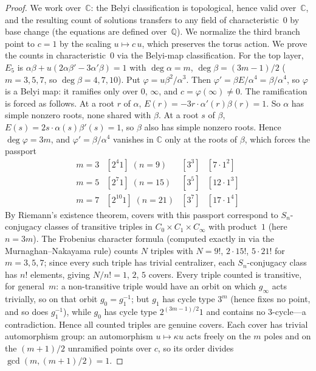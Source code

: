 \documentclass[a4paper,11pt]{article}
\newcommand{\filename}[1]{\texttt{\seqsplit{#1}}}
\theoremstyle{plain}
\theoremstyle{definition}
\theoremstyle{remark}
\begin{document}
\begin{proof}
We work over~$\mathbb{C}$: the Belyi classification is topological, hence valid over~$\mathbb{C}$, and the resulting count of solutions transfers to any field of characteristic~$0$ by base change (the equations are defined over~$\mathbb{Q}$). We normalize the third branch point to $c=1$ by the scaling $u\mapsto c\,u$, which preserves the torus action. We prove the counts in characteristic~$0$ via the Belyi-map classification. For the top layer, $E_5$ is $\alpha\beta+u(2\alpha\beta'-3\alpha'\beta)=1$ with $\deg\alpha=m$, $\deg\beta=(3m-1)/2$ ($m=3,5,7$, so $\deg\beta=4,7,10$). Put $\varphi=u\beta^2/\alpha^3$. Then $\varphi'=\beta E/\alpha^4=\beta/\alpha^4$, so $\varphi$ is a Belyi map: it ramifies only over $0$, $\infty$, and $c=\varphi(\infty)\neq0$. The ramification is forced as follows. At a root $r$ of $\alpha$, $E(r)=-3r\cdot\alpha'(r)\beta(r)=1$. So $\alpha$ has simple nonzero roots, none shared with $\beta$. At a root $s$ of $\beta$, $E(s)=2s\cdot\alpha(s)\beta'(s)=1$, so $\beta$ also has simple nonzero roots. Hence $\deg\varphi=3m$, and $\varphi'=\beta/\alpha^4$ vanishes in $\mathbb{C}$ only at the roots of $\beta$, which forces the passport
\[
\begin{array}{c|ccc}
m=3 & [2^4 1]\;(n=9) & [3^3] & [7\cdot 1^2]\\
m=5 & [2^7 1]\;(n=15) & [3^5] & [12\cdot 1^3]\\
m=7 & [2^{10}1]\;(n=21) & [3^7] & [17\cdot 1^4]
\end{array}
\]
By Riemann's existence theorem, covers with this passport correspond to $S_n$-conjugacy classes of transitive triples in $C_0\times C_1\times C_\infty$ with product~$1$ (here $n=3m$). The Frobenius character formula (computed exactly in \filename{belyi\_counts\_m357.py} via the Murnaghan--Nakayama rule) counts $N$ triples with $N=9!$, $2\cdot15!$, $5\cdot21!$ for $m=3,5,7$; since every such triple has trivial centralizer, each $S_n$-conjugacy class has $n!$ elements, giving $N/n!=1$, $2$, $5$ covers. Every triple counted is transitive, for general~$m$: a non-transitive triple would have an orbit on which $g_\infty$ acts trivially, so on that orbit $g_0=g_1^{-1}$; but $g_1$ has cycle type $3^m$ (hence fixes no point, and so does $g_1^{-1}$), while $g_0$ has cycle type $2^{(3m-1)/2}1$ and contains no $3$-cycle---a contradiction. Hence all counted triples are genuine covers. Each cover has trivial automorphism group: an automorphism $u\mapsto\kappa u$ acts freely on the $m$ poles and on the $(m+1)/2$ unramified points over $c$, so its order divides $\gcd(m,(m+1)/2)=1$.


\end{proof}
\end{document}
